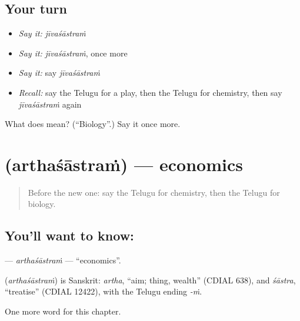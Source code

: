 \subsection*{Your turn}
\begin{itemize}
\raggedright
  \item \emph{Say it:} \emph{jīvaśāstraṁ}
  \item \emph{Say it:} \emph{jīvaśāstraṁ}, once more
  \item \emph{Say it:} say \emph{jīvaśāstraṁ}
  \item \emph{Recall:} say the Telugu for a play, then the Telugu for chemistry, then say \emph{jīvaśāstraṁ} again
\end{itemize}

\begin{tcolorbox}[breakable,colback=teal!4,colframe=teal!35!black,title={Before you move on}]
What does  mean? (\textquotedblleft{}Biology\textquotedblright{}.) Say it once more.
\end{tcolorbox}
\section[\texorpdfstring{\te{అర్థశాస్త్రం} (arthaśāstraṁ)}{అర్థశాస్త్రం (arthaśāstraṁ)}]{ (arthaśāstraṁ) — economics}

\label{lesson:TE-C276-arthasastram}



\begin{quote}
Before the new one: say the Telugu for chemistry, then the Telugu for biology.
\end{quote}

\subsection*{You'll want to know: }
\textbf{} — \emph{arthaśāstraṁ} — \textquotedblleft{}economics\textquotedblright{}.

\begin{cousinweb}
\textbf{} (\emph{arthaśāstraṁ}) is Sanskrit: \emph{artha}, \textquotedblleft{}aim; thing, wealth\textquotedblright{} (CDIAL 638), and \emph{śāstra}, \textquotedblleft{}treatise\textquotedblright{} (CDIAL 12422), with the Telugu ending \emph{-ṁ}.
\end{cousinweb}

\begin{grammarlens}[title={What you've built}]
One more word for this chapter.
\end{grammarlens}

